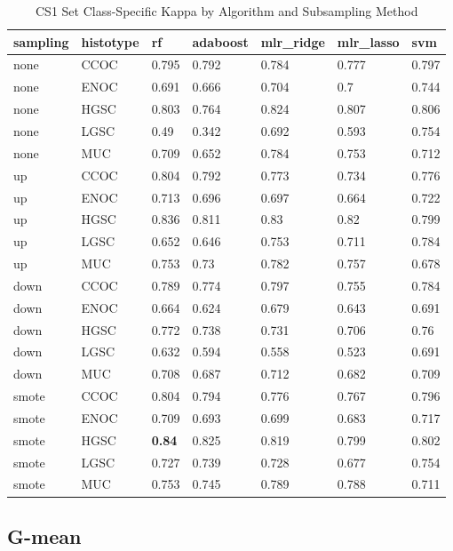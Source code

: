 \documentclass[
]{report}
\begin{document}
\begin{table}

\caption{\label{tab:cs1-kappa-class-table}CS1 Set Class-Specific Kappa by Algorithm and Subsampling Method}
\centering
\begin{tabular}[t]{l|l|l|l|l|l|l}
\hline
sampling & histotype & rf & adaboost & mlr\_ridge & mlr\_lasso & svm\\
\hline
none & CCOC & 0.795 & 0.792 & 0.784 & 0.777 & 0.797\\
\hline
none & ENOC & 0.691 & 0.666 & 0.704 & 0.7 & 0.744\\
\hline
none & HGSC & 0.803 & 0.764 & 0.824 & 0.807 & 0.806\\
\hline
none & LGSC & 0.49 & 0.342 & 0.692 & 0.593 & 0.754\\
\hline
none & MUC & 0.709 & 0.652 & 0.784 & 0.753 & 0.712\\
\hline
up & CCOC & 0.804 & 0.792 & 0.773 & 0.734 & 0.776\\
\hline
up & ENOC & 0.713 & 0.696 & 0.697 & 0.664 & 0.722\\
\hline
up & HGSC & 0.836 & 0.811 & 0.83 & 0.82 & 0.799\\
\hline
up & LGSC & 0.652 & 0.646 & 0.753 & 0.711 & 0.784\\
\hline
up & MUC & 0.753 & 0.73 & 0.782 & 0.757 & 0.678\\
\hline
down & CCOC & 0.789 & 0.774 & 0.797 & 0.755 & 0.784\\
\hline
down & ENOC & 0.664 & 0.624 & 0.679 & 0.643 & 0.691\\
\hline
down & HGSC & 0.772 & 0.738 & 0.731 & 0.706 & 0.76\\
\hline
down & LGSC & 0.632 & 0.594 & 0.558 & 0.523 & 0.691\\
\hline
down & MUC & 0.708 & 0.687 & 0.712 & 0.682 & 0.709\\
\hline
smote & CCOC & 0.804 & 0.794 & 0.776 & 0.767 & 0.796\\
\hline
smote & ENOC & 0.709 & 0.693 & 0.699 & 0.683 & 0.717\\
\hline
smote & HGSC & \textbf{0.84} & 0.825 & 0.819 & 0.799 & 0.802\\
\hline
smote & LGSC & 0.727 & 0.739 & 0.728 & 0.677 & 0.754\\
\hline
smote & MUC & 0.753 & 0.745 & 0.789 & 0.788 & 0.711\\
\hline
\end{tabular}
\end{table}

\hypertarget{g-mean-1}{%
\subsection{G-mean}\label{g-mean-1}}
\end{document}
